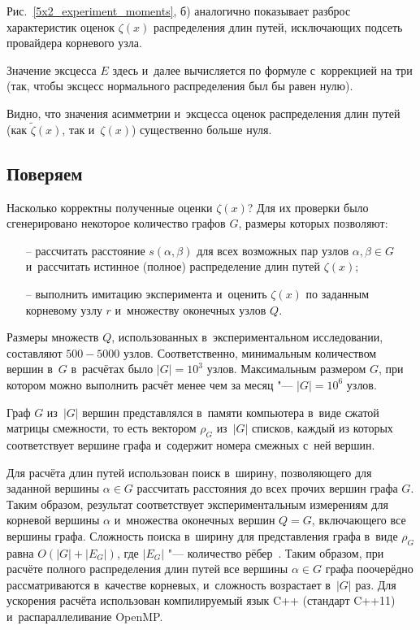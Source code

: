 \documentclass[10pt, a5paper]{article}
\begin{document}
Рис.~\ref{5x2_experiment_moments}, б) аналогично показывает разброс характеристик оценок $\zeta(x)$ распределения длин путей, исключающих подсеть провайдера корневого узла.

Значение эксцесса $E$ здесь и~далее вычисляется по формуле с~коррекцией на три (так, чтобы эксцесс нормального распределения был бы равен нулю).

Видно, что значения асимметрии и~эксцесса оценок распределения длин путей (как $\widetilde{\zeta}(x)$, так и~$\zeta(x)$) существенно больше нуля.

\subsection*{Поверяем}

Насколько корректны полученные оценки $\zeta(x)$?
% 
Для их проверки было сгенерировано некоторое количество графов $G$, размеры которых позволяют:
\begin{itemize}
	\item[--]рассчитать расстояние $s(\alpha, \beta)$ для всех возможных пар узлов $\alpha, \beta \in G$ и~рассчитать истинное (полное) распределение длин путей $\zeta(x)$;
	
	\item[--] %
	выполнить имитацию эксперимента и~оценить  $\zeta(x)$ по 
заданным корневому узлу $r$ и~множеству оконечных узлов $Q$.
\end{itemize}
Размеры множеств $Q$, использованных в~экспериментальном исследовании, составляют $500-5000$ узлов.
Соответственно, минимальным количеством вершин в~$G$ в~расчётах было $|G| = 10^3$ узлов.
Максимальным размером $G$, при котором можно выполнить расчёт менее чем за месяц "--- $|G| = 10^6$ узлов.

Граф $G$ из~$|G|$ вершин представлялся в~памяти компьютера в~виде сжатой матрицы смежности,
то есть вектором $\rho_G$ из~$|G|$ списков,
каждый из которых соответствует вершине графа  и~содержит номера смежных с~ней вершин.

Для расчёта длин путей использован  поиск в~ширину,
позволяющего для заданной вершины  $\alpha \in G$ рассчитать расстояния до всех прочих вершин графа $G$.
Таким образом, результат соответствует экспериментальным измерениям для корневой вершины $\alpha$ и~множества оконечных вершин $Q=G$, включающего все вершины графа.
Сложность поиска в~ширину для представления графа в~виде $\rho_G$  равна $O(|G| +|E_G|)$, где $|E_G|$ "--- количество рёбер~\cite{Sedgewick2002_AlgorithmsinC_Fundamentals}.
Таким образом, при расчёте полного распределения длин путей все вершины $\alpha \in G$ графа  поочерёдно рассматриваются в~качестве корневых, и~сложность возрастает в~$|G|$ раз.
Для ускорения расчёта  использован компилируемый язык C++ (стандарт C++11) и~распараллеливание OpenMP.
\end{document}

